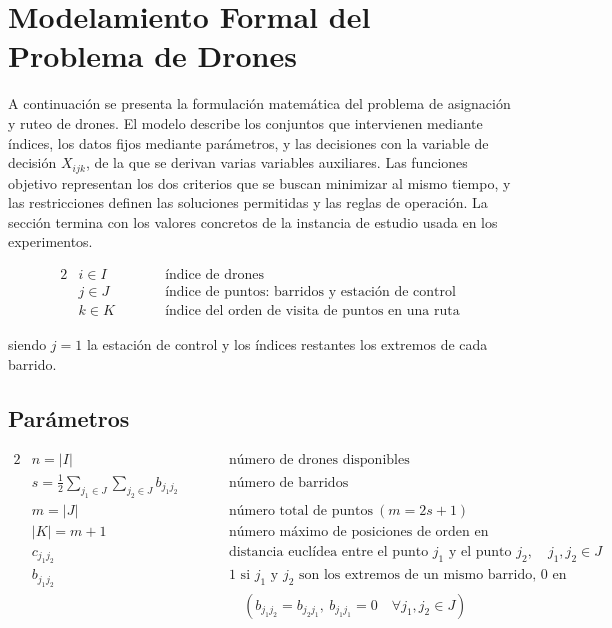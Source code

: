 \documentclass[11pt,a4paper]{article}
\begin{document}
\section{Modelamiento Formal del Problema de Drones}

A continuación se presenta la formulación matemática del problema de asignación y ruteo de drones. El modelo describe los conjuntos que intervienen mediante índices, los datos fijos mediante parámetros, y las decisiones con la variable de decisión \(X_{ijk}\), de la que se derivan varias variables auxiliares. Las funciones objetivo representan los dos criterios que se buscan minimizar al mismo tiempo, y las restricciones definen las soluciones permitidas y las reglas de operación. La sección termina con los valores concretos de la instancia de estudio usada en los experimentos.

\begin{alignat}{2}
&i \in I \qquad && \text{índice de drones} \\
&j \in J \qquad && \text{índice de puntos: barridos y estación de control} \\
&k \in K \qquad && \text{índice del orden de visita de puntos en una ruta}
\end{alignat}

\noindent siendo $j = 1$ la estación de control y los índices restantes los extremos de cada barrido.

\subsection*{Parámetros}

\begin{alignat}{2}
&n = |I|          \qquad && \text{número de drones disponibles} \\
&s = \frac{1}{2}\sum_{j_1 \in J}\sum_{j_2 \in J} b_{j_1 j_2} \qquad && \text{número de barridos} \\
&m = |J|          \qquad && \text{número total de puntos}\ (m = 2s + 1) \\
&|K| = m + 1      \qquad && \text{número máximo de posiciones de orden en una ruta} \\
&c_{j_1 j_2}     \qquad && \text{distancia euclídea entre el punto } j_1 \text{ y el punto } j_2, \quad j_1, j_2 \in J \\
&b_{j_1 j_2}     \qquad && \text{1 si } j_1 \text{ y } j_2 \text{ son los extremos de un mismo barrido, 0 en otro caso} \\
&                \qquad && \quad (b_{j_1 j_2} = b_{j_2 j_1},\ b_{j_1 j_1} = 0 \quad \forall j_1, j_2 \in J)
\end{alignat}
\end{document}

